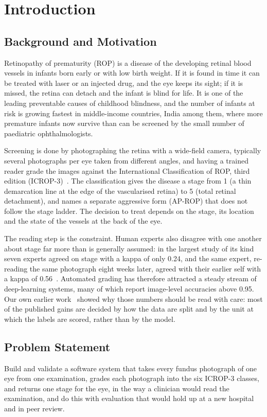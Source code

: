 \chapter{Introduction}\label{ch:introduction}
\thispagestyle{empty}%
\section{Background and Motivation}
Retinopathy of prematurity (ROP) is a disease of the developing retinal blood vessels in infants born early or with low birth weight. If it is found in time it can be treated with laser or an injected drug, and the eye keeps its sight; if it is missed, the retina can detach and the infant is blind for life. It is one of the leading preventable causes of childhood blindness, and the number of infants at risk is growing fastest in middle-income countries, India among them, where more premature infants now survive than can be screened by the small number of paediatric ophthalmologists.

Screening is done by photographing the retina with a wide-field camera, typically several photographs per eye taken from different angles, and having a trained reader grade the images against the International Classification of ROP, third edition (ICROP-3)~\cite{icrop3}. The classification gives the disease a stage from 1 (a thin demarcation line at the edge of the vascularised retina) to 5 (total retinal detachment), and names a separate aggressive form (AP-ROP) that does not follow the stage ladder. The decision to treat depends on the stage, its location and the state of the vessels at the back of the eye.

The reading step is the constraint. Human experts also disagree with one another about stage far more than is generally assumed: in the largest study of its kind seven experts agreed on stage with a kappa of only 0.24, and the same expert, re-reading the same photograph eight weeks later, agreed with their earlier self with a kappa of 0.56~\cite{gschliesser2015}. Automated grading has therefore attracted a steady stream of deep-learning systems, many of which report image-level accuracies above 0.95. Our own earlier work~\cite{nagpure2026} showed why those numbers should be read with care: most of the published gains are decided by how the data are split and by the unit at which the labels are scored, rather than by the model.

\section{Problem Statement}
Build and validate a software system that takes every fundus photograph of one eye from one examination, grades each photograph into the six ICROP-3 classes, and returns one stage for the eye, in the way a clinician would read the examination, and do this with evaluation that would hold up at a new hospital and in peer review.

